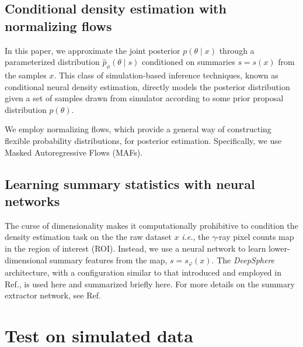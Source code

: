\documentclass[prd,aps,10pt,nofootinbib,twocolumn,superscriptaddress,preprintnumbers,balancelastpage,longbibliography]{revtex4-1}
\begin{document}
\subsection{Conditional density estimation with normalizing flows}

In this paper, we approximate the joint posterior $p(\theta\mid x)$ through a parameterized distribution $\hat p_\phi(\theta\mid s)$ conditioned on summaries $s=s(x)$ from the samples $x$. This class of simulation-based inference techniques, known as conditional neural density estimation, directly models the posterior distribution given a set of samples drawn from simulator according to some prior proposal distribution $p(\theta)$.

We employ normalizing flows, which provide a general way of constructing flexible probability distributions, for posterior estimation. Specifically, we use Masked Autoregressive Flows (MAFs).

\subsection{Learning summary statistics with neural networks}

The curse of dimensionality makes it computationally prohibitive to condition the density estimation task on the the raw dataset $x$ \emph{i.e.}, the $\gamma$-ray pixel counts map in the region of interest (ROI). Instead, we use a neural network to learn lower-dimensional summary features from the map, $s = s_\varphi(x)$. The \emph{DeepSphere} architecture, with a configuration similar to that introduced and employed in Ref., is used here and summarized briefly here. For more details on the summary extractor network, see Ref.

\subsection{}


\section{Test on simulated data}
\label{sec:simulations}
\end{document}
